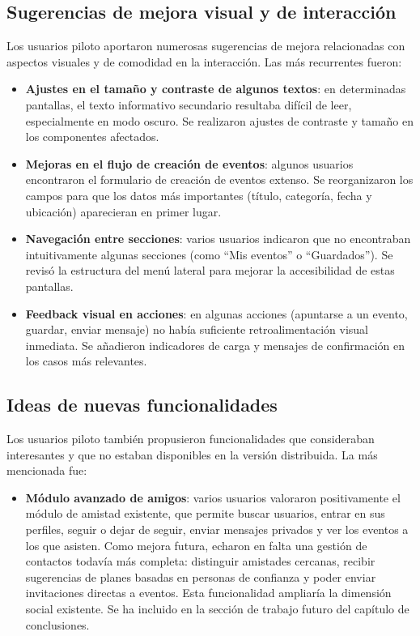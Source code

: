 \subsection{Sugerencias de mejora visual y de interacción}

Los usuarios piloto aportaron numerosas sugerencias de mejora relacionadas con aspectos visuales y de comodidad en la interacción. Las más recurrentes fueron:

\begin{itemize}
    \item \textbf{Ajustes en el tamaño y contraste de algunos textos}: en determinadas pantallas, el texto informativo secundario resultaba difícil de leer, especialmente en modo oscuro. Se realizaron ajustes de contraste y tamaño en los componentes afectados.

    \item \textbf{Mejoras en el flujo de creación de eventos}: algunos usuarios encontraron el formulario de creación de eventos extenso. Se reorganizaron los campos para que los datos más importantes (título, categoría, fecha y ubicación) aparecieran en primer lugar.

    \item \textbf{Navegación entre secciones}: varios usuarios indicaron que no encontraban intuitivamente algunas secciones (como ``Mis eventos'' o ``Guardados''). Se revisó la estructura del menú lateral para mejorar la accesibilidad de estas pantallas.

    \item \textbf{Feedback visual en acciones}: en algunas acciones (apuntarse a un evento, guardar, enviar mensaje) no había suficiente retroalimentación visual inmediata. Se añadieron indicadores de carga y mensajes de confirmación en los casos más relevantes.
\end{itemize}

\subsection{Ideas de nuevas funcionalidades}

Los usuarios piloto también propusieron funcionalidades que consideraban interesantes y que no estaban disponibles en la versión distribuida. La más mencionada fue:

\begin{itemize}
    \item \textbf{Módulo avanzado de amigos}: varios usuarios valoraron positivamente el módulo de amistad existente, que permite buscar usuarios, entrar en sus perfiles, seguir o dejar de seguir, enviar mensajes privados y ver los eventos a los que asisten. Como mejora futura, echaron en falta una gestión de contactos todavía más completa: distinguir amistades cercanas, recibir sugerencias de planes basadas en personas de confianza y poder enviar invitaciones directas a eventos. Esta funcionalidad ampliaría la dimensión social existente. Se ha incluido en la sección de trabajo futuro del capítulo de conclusiones.
\end{itemize}

